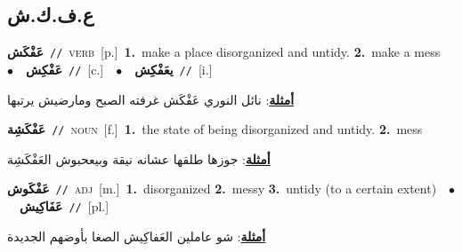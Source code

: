 \documentclass[10pt,a4paper,twoside]{article} %
\begin{document}
\begin{multicols}{2}
\vspace{-3mm}
\subsection*{\color{blue}\foreignlanguage{arabic}{ع.ف.ك.ش}\color{blue}{}} 

{\setlength\topsep{0pt}\textbf{\foreignlanguage{arabic}{عَفْكَش}}\ {\color{gray}\texttt{//}\color{black}}\ \textsc{verb}\ [p.]\ \textbf{1.}~make a place disorganized and untidy.  \textbf{2.}~make a mess\ \ $\bullet$\ \ \setlength\topsep{0pt}\textbf{\foreignlanguage{arabic}{عَفْكِش}}\ {\color{gray}\texttt{//}\color{black}}\ [c.]\ \ $\bullet$\ \ \setlength\topsep{0pt}\textbf{\foreignlanguage{arabic}{يعَفْكِش}}\ {\color{gray}\texttt{//}\color{black}}\ [i.]\  \begin{flushright}\color{gray}\foreignlanguage{arabic}{\textbf{\underline{\foreignlanguage{arabic}{أمثلة}}}: نائل النوري عَفْكَش غرفته الصبح ومارضيش يرتبها}\end{flushright}\color{black}} \vspace{2mm}

{\setlength\topsep{0pt}\textbf{\foreignlanguage{arabic}{عَفْكَشِة}}\ {\color{gray}\texttt{//}\color{black}}\ \textsc{noun}\ [f.]\ \textbf{1.}~the state of being disorganized and untidy.  \textbf{2.}~mess\  \begin{flushright}\color{gray}\foreignlanguage{arabic}{\textbf{\underline{\foreignlanguage{arabic}{أمثلة}}}: جوزها طلقها عشانه نيقة وبيعحبوش العَفْكَشِة}\end{flushright}\color{black}} \vspace{2mm}

{\setlength\topsep{0pt}\textbf{\foreignlanguage{arabic}{عَفْكَوش}}\ {\color{gray}\texttt{//}\color{black}}\ \textsc{adj}\ [m.]\ \textbf{1.}~disorganized  \textbf{2.}~messy  \textbf{3.}~untidy (to a certain extent)\ \ $\bullet$\ \ \setlength\topsep{0pt}\textbf{\foreignlanguage{arabic}{عَفَاكِيش}}\ {\color{gray}\texttt{//}\color{black}}\ [pl.]\  \begin{flushright}\color{gray}\foreignlanguage{arabic}{\textbf{\underline{\foreignlanguage{arabic}{أمثلة}}}: شو عاملين العَفاكِيش الصغا بأوضهم الجديدة}\end{flushright}\color{black}} \vspace{2mm}


\end{multicols}
\end{document}
